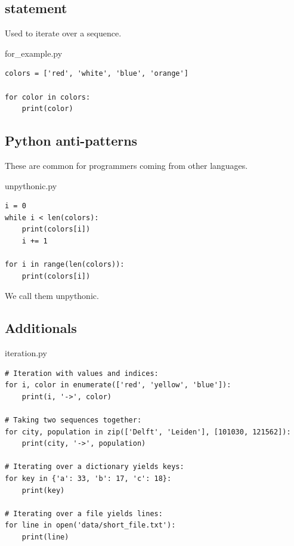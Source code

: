 \documentclass[aspectratio=1610,t]{beamer}
\begin{document}
\subsection{ statement}
\begin{pframe}
 Used to iterate over a sequence.
 \begin{pythonfile}{for\_example.py}
  \begin{verbatim}
colors = ['red', 'white', 'blue', 'orange']

for color in colors:
    print(color)
  \end{verbatim}
 \end{pythonfile}
 \pause
 \begin{terminal}
 \end{terminal}
\end{pframe}


\subsection{Python anti-patterns}
\begin{pframe}
These are common for programmers coming from other languages.
 \begin{pythonfile}{unpythonic.py}
  \begin{verbatim}
i = 0
while i < len(colors):
    print(colors[i])
    i += 1

for i in range(len(colors)):
    print(colors[i])
  \end{verbatim}
 \end{pythonfile}

We call them unpythonic.
\end{pframe}


\subsection{Additionals}
\begin{pframe}
 \begin{pythonfile}{iteration.py}
  \begin{verbatim}
# Iteration with values and indices:
for i, color in enumerate(['red', 'yellow', 'blue']):
    print(i, '->', color)

# Taking two sequences together:
for city, population in zip(['Delft', 'Leiden'], [101030, 121562]):
    print(city, '->', population)

# Iterating over a dictionary yields keys:
for key in {'a': 33, 'b': 17, 'c': 18}:
    print(key)

# Iterating over a file yields lines:
for line in open('data/short_file.txt'):
    print(line)
  \end{verbatim}
 \end{pythonfile}
\end{pframe}
\end{document}
